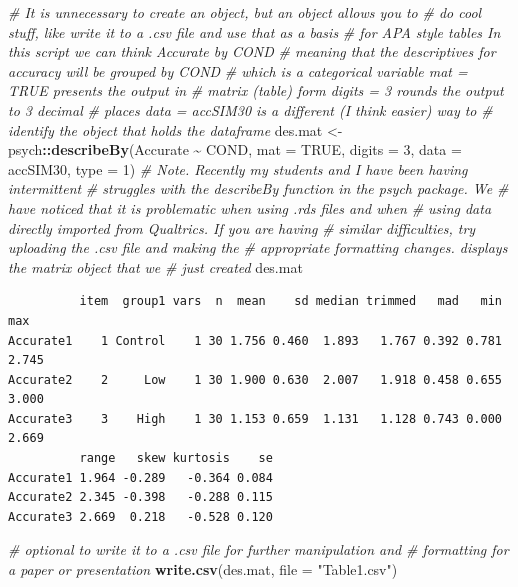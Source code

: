 \documentclass[
  11pt,
]{book}
\newenvironment{Shaded}{\begin{snugshade}}{\end{snugshade}}
\newcommand{\AttributeTok}[1]{\textcolor[rgb]{0.27,0.27,0.27}{#1}}
\newcommand{\CommentTok}[1]{\textcolor[rgb]{0.37,0.37,0.37}{\textit{#1}}}
\newcommand{\ConstantTok}[1]{\textcolor[rgb]{0.37,0.37,0.37}{#1}}
\newcommand{\DecValTok}[1]{\textcolor[rgb]{0.06,0.06,0.06}{#1}}
\newcommand{\FunctionTok}[1]{\textcolor[rgb]{0.27,0.27,0.27}{\textbf{#1}}}
\newcommand{\NormalTok}[1]{#1}
\newcommand{\OtherTok}[1]{\textcolor[rgb]{0.37,0.37,0.37}{#1}}
\newcommand{\SpecialCharTok}[1]{\textcolor[rgb]{0.43,0.43,0.43}{\textbf{#1}}}
\newcommand{\StringTok}[1]{\textcolor[rgb]{0.5,0.5,0.5}{#1}}
\begin{document}
\begin{Shaded}
\begin{Highlighting}[]
\CommentTok{\# It is unnecessary to create an object, but an object allows you to}
\CommentTok{\# do cool stuff, like write it to a .csv file and use that as a basis}
\CommentTok{\# for APA style tables In this script we can think \textquotesingle{}Accurate by COND\textquotesingle{}}
\CommentTok{\# meaning that the descriptives for accuracy will be grouped by COND}
\CommentTok{\# which is a categorical variable mat = TRUE presents the output in}
\CommentTok{\# matrix (table) form digits = 3 rounds the output to 3 decimal}
\CommentTok{\# places data = accSIM30 is a different (I think easier) way to}
\CommentTok{\# identify the object that holds the dataframe}
\NormalTok{des.mat }\OtherTok{\textless{}{-}}\NormalTok{ psych}\SpecialCharTok{::}\FunctionTok{describeBy}\NormalTok{(Accurate }\SpecialCharTok{\textasciitilde{}}\NormalTok{ COND, }\AttributeTok{mat =} \ConstantTok{TRUE}\NormalTok{, }\AttributeTok{digits =} \DecValTok{3}\NormalTok{, }\AttributeTok{data =}\NormalTok{ accSIM30,}
    \AttributeTok{type =} \DecValTok{1}\NormalTok{)}
\CommentTok{\# Note. Recently my students and I have been having intermittent}
\CommentTok{\# struggles with the describeBy function in the psych package. We}
\CommentTok{\# have noticed that it is problematic when using .rds files and when}
\CommentTok{\# using data directly imported from Qualtrics. If you are having}
\CommentTok{\# similar difficulties, try uploading the .csv file and making the}
\CommentTok{\# appropriate formatting changes. displays the matrix object that we}
\CommentTok{\# just created}
\NormalTok{des.mat}
\end{Highlighting}
\end{Shaded}

\begin{verbatim}
          item  group1 vars  n  mean    sd median trimmed   mad   min   max
Accurate1    1 Control    1 30 1.756 0.460  1.893   1.767 0.392 0.781 2.745
Accurate2    2     Low    1 30 1.900 0.630  2.007   1.918 0.458 0.655 3.000
Accurate3    3    High    1 30 1.153 0.659  1.131   1.128 0.743 0.000 2.669
          range   skew kurtosis    se
Accurate1 1.964 -0.289   -0.364 0.084
Accurate2 2.345 -0.398   -0.288 0.115
Accurate3 2.669  0.218   -0.528 0.120
\end{verbatim}

\begin{Shaded}
\begin{Highlighting}[]
\CommentTok{\# optional to write it to a .csv file for further manipulation and}
\CommentTok{\# formatting for a paper or presentation}
\FunctionTok{write.csv}\NormalTok{(des.mat, }\AttributeTok{file =} \StringTok{"Table1.csv"}\NormalTok{)}
\end{Highlighting}
\end{Shaded}
\end{document}
